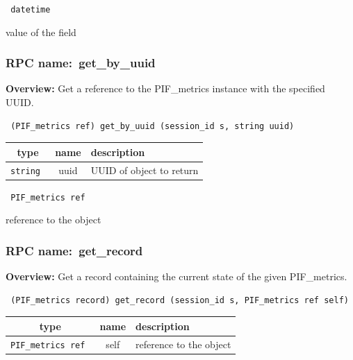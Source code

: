 \vspace{0.3cm}

{\tt 
datetime
}


value of the field
\vspace{0.3cm}
\vspace{0.3cm}
\vspace{0.3cm}
\subsubsection{RPC name:~get\_by\_uuid}

{\bf Overview:} 
Get a reference to the PIF\_metrics instance with the specified UUID.

\begin{verbatim} (PIF_metrics ref) get_by_uuid (session_id s, string uuid)\end{verbatim}



 
\vspace{0.3cm}
\begin{tabular}{|c|c|p{7cm}|}
 \hline
{\bf type} & {\bf name} & {\bf description} \\ \hline
{\tt string } & uuid & UUID of object to return \\ \hline 

\end{tabular}

\vspace{0.3cm}

{\tt 
PIF\_metrics ref
}


reference to the object
\vspace{0.3cm}
\vspace{0.3cm}
\vspace{0.3cm}
\subsubsection{RPC name:~get\_record}

{\bf Overview:} 
Get a record containing the current state of the given PIF\_metrics.

\begin{verbatim} (PIF_metrics record) get_record (session_id s, PIF_metrics ref self)\end{verbatim}



 
\vspace{0.3cm}
\begin{tabular}{|c|c|p{7cm}|}
 \hline
{\bf type} & {\bf name} & {\bf description} \\ \hline
{\tt PIF\_metrics ref } & self & reference to the object \\ \hline 

\end{tabular}

